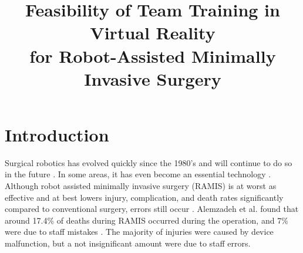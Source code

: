 \documentclass[conference]{IEEEtran}
\begin{document}
\title{Feasibility of Team Training in Virtual Reality \\ for Robot-Assisted Minimally Invasive Surgery}


\maketitle
\thispagestyle{fancy}

\begin{abstract}


\end{abstract}





%
\IEEEpeerreviewmaketitle



\section{Introduction}

Surgical robotics has evolved quickly since the 1980's and will continue to do so in the future \citep{taylor_medical_2008}. In some areas, it has even become an essential technology \citep{sivaraman_robotics_2015}. Although robot assisted minimally invasive surgery (RAMIS) is at worst as effective and at best lowers injury, complication, and death rates significantly compared to conventional surgery, errors still occur \citep{razmaria_does_2014, punnen_how_2013, sung_oncologic_2016,raza_long-term_2015}. Alemzadeh et al. found that around 17.4\% of deaths during RAMIS occurred during the operation, and 7\% were due to staff mistakes \citep{alemzadeh_adverse_2016}. The majority of injuries were caused by device malfunction, but a not insignificant amount were due to staff errors. %
\end{document}
